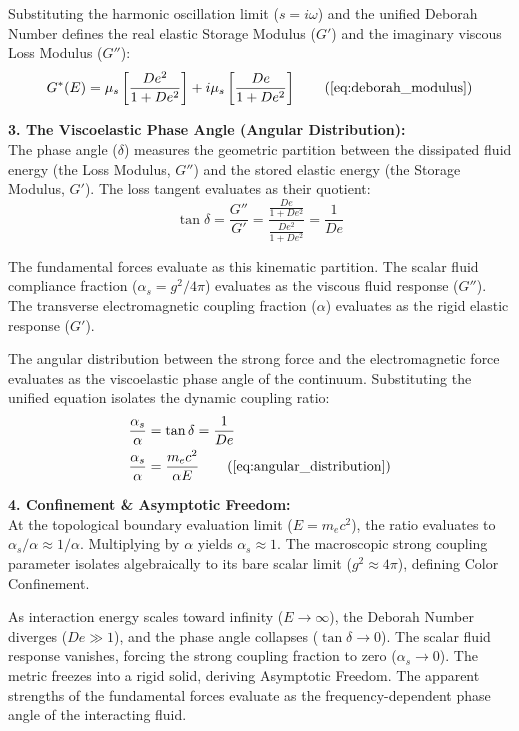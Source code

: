 \documentclass[11pt, a4paper]{article}
\begin{document}
Substituting the harmonic oscillation limit ($s = i\omega$) and the unified Deborah Number defines the real elastic Storage Modulus ($G'$) and the imaginary viscous Loss Modulus ($G''$):
\begin{equation}
    G^*(E) = \mu_s \left[ \frac{De^2}{1 + De^2} \right] + i \mu_s \left[ \frac{De}{1 + De^2} \right] \tag{\ref{eq:deborah_modulus}}
\end{equation}

\textbf{3. The Viscoelastic Phase Angle (Angular Distribution):} \\
The phase angle ($\delta$) measures the geometric partition between the dissipated fluid energy (the Loss Modulus, $G''$) and the stored elastic energy (the Storage Modulus, $G'$). The loss tangent evaluates as their quotient:
\begin{equation}
    \tan \delta = \frac{G''}{G'} = \frac{\frac{De}{1+De^2}}{\frac{De^2}{1+De^2}} = \frac{1}{De}
\end{equation}

The fundamental forces evaluate as this kinematic partition. The scalar fluid compliance fraction ($\alpha_s = g^2/4\pi$) evaluates as the viscous fluid response ($G''$). The transverse electromagnetic coupling fraction ($\alpha$) evaluates as the rigid elastic response ($G'$). 

The angular distribution between the strong force and the electromagnetic force evaluates as the viscoelastic phase angle of the continuum. Substituting the unified equation isolates the dynamic coupling ratio:
\begin{align}
    \frac{\alpha_s}{\alpha} &= \tan \delta = \frac{1}{De} \\
    \frac{\alpha_s}{\alpha} &= \frac{m_e c^2}{\alpha E} \tag{\ref{eq:angular_distribution}}
\end{align}

\textbf{4. Confinement \& Asymptotic Freedom:} \\
At the topological boundary evaluation limit ($E = m_e c^2$), the ratio evaluates to $\alpha_s / \alpha \approx 1/\alpha$. Multiplying by $\alpha$ yields $\alpha_s \approx 1$. The macroscopic strong coupling parameter isolates algebraically to its bare scalar limit ($g^2 \approx 4\pi$), defining Color Confinement. 

As interaction energy scales toward infinity ($E \to \infty$), the Deborah Number diverges ($De \gg 1$), and the phase angle collapses ($\tan \delta \to 0$). The scalar fluid response vanishes, forcing the strong coupling fraction to zero ($\alpha_s \to 0$). The metric freezes into a rigid solid, deriving Asymptotic Freedom. The apparent strengths of the fundamental forces evaluate as the frequency-dependent phase angle of the interacting fluid.
\end{document}
